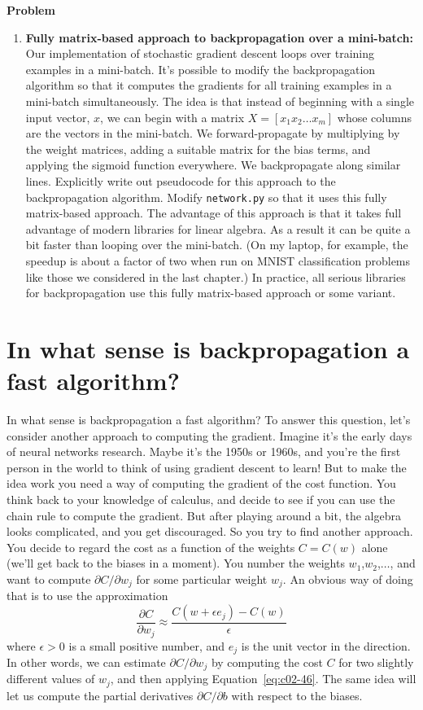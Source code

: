 \textbf{Problem}
\begin{enumerate}
\item
\textbf{Fully matrix-based approach to backpropagation over a mini-batch:} Our implementation of stochastic gradient descent loops over training examples in a mini-batch. It's possible to modify the backpropagation algorithm so that it computes the gradients for all training examples in a mini-batch simultaneously. The idea is that instead of beginning with a single input vector, $x$, we can begin with a matrix $X=\left[x_{1} x_{2} \ldots x_{m}\right]$ whose columns are the vectors in the mini-batch. We forward-propagate by multiplying by the weight matrices, adding a suitable matrix for the bias terms, and applying the sigmoid function everywhere. We backpropagate along similar lines. Explicitly write out pseudocode for this approach to the backpropagation algorithm. Modify \lstinline{network.py} so that it uses this fully matrix-based approach. The advantage of this approach is that it takes full advantage of modern libraries for linear algebra. As a result it can be quite a bit faster than looping over the mini-batch. (On my laptop, for example, the speedup is about a factor of two when run on MNIST classification problems like those we considered in the last chapter.) In practice, all serious libraries for backpropagation use this fully matrix-based approach or some variant. 
\end{enumerate}

\section{In what sense is backpropagation a fast algorithm?}

In what sense is backpropagation a fast algorithm? To answer this question, let's consider another approach to computing the gradient. Imagine it's the early days of neural networks research. Maybe it's the 1950s or 1960s, and you're the first person in the world to think of using gradient descent to learn! But to make the idea work you need a way of computing the gradient of the cost function. You think back to your knowledge of calculus, and decide to see if you can use the chain rule to compute the gradient. But after playing around a bit, the algebra looks complicated, and you get discouraged. So you try to find another approach. You decide to regard the cost as a function of the weights $C=C(w)$ alone (we'll get back to the biases in a moment). You number the weights $w_1$,$w_2$,$\ldots$, and want to compute $\partial C / \partial w_{j}$ for some particular weight $w_j$. An obvious way of doing that is to use the approximation 
\begin{equation}
\frac{\partial C}{\partial w_{j}} \approx \frac{C\left(w+\epsilon e_{j}\right)-C(w)}{\epsilon}
\label{eq:c02-46}
\end{equation}
where $\epsilon>0$ is a small positive number, and $e_j$ is the unit vector in the  direction. In other words, we can estimate $\partial C / \partial w_{j}$ by computing the cost $C$ for two slightly different values of $w_j$, and then applying Equation~\ref{eq:c02-46}. The same idea will let us compute the partial derivatives $\partial C / \partial b$ with respect to the biases.

